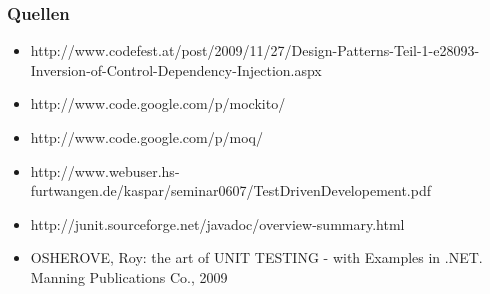\documentclass{beamer}
\begin{document}
\begin{appendix}
\begin{frame}
\frametitle{Quellen}
\begin{itemize}
\item http://www.codefest.at/post/2009/11/27/Design-Patterns-Teil-1-e28093-Inversion-of-Control-Dependency-Injection.aspx
\item http://www.code.google.com/p/mockito/
\item http://www.code.google.com/p/moq/
\item http://www.webuser.hs-furtwangen.de/kaspar/seminar0607/TestDrivenDevelopement.pdf
\item http://junit.sourceforge.net/javadoc/overview-summary.html
\item OSHEROVE, Roy: the art of UNIT TESTING - with Examples in .NET. Manning Publications Co., 2009
\end{itemize}
\end{frame}
\end{appendix}
\end{document}

